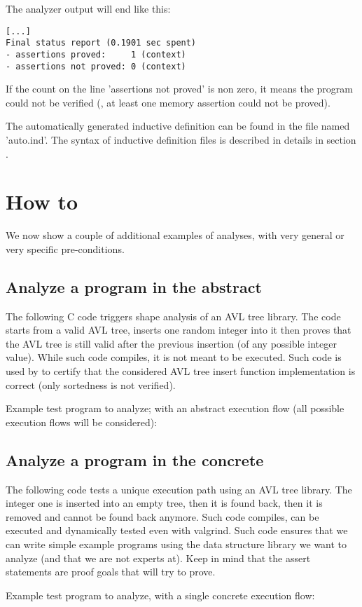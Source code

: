 The analyzer output will end like this:
\begin{verbatim}
[...]
Final status report (0.1901 sec spent)
- assertions proved:     1 (context)
- assertions not proved: 0 (context)
\end{verbatim}
If the count on the line 'assertions not proved' is non zero, it means
the program could not be verified (\ie, at least one memory assertion
could not be proved).

The automatically generated inductive definition can be found in the file
named 'auto.ind'.
The syntax of inductive definition files is described in details
in section .

\section{How to}
We now show a couple of additional examples of analyses, with very general
or very specific pre-conditions.

\subsection{Analyze a program in the abstract}
The following C code triggers shape analysis of an AVL tree library.
The code starts from a valid AVL tree, inserts one random integer
into it then proves that the AVL tree is still valid after
the previous insertion (of any possible integer value).
While such code compiles, it is not meant to be executed.
Such code is used by \memcad to certify that
the considered AVL tree insert function implementation is correct
(only sortedness is not verified).

Example test program to analyze; with an abstract
execution flow (all possible execution flows will be considered):


\subsection{Analyze a program in the concrete}
The following code tests a unique execution path using an AVL tree library.
The integer one is inserted into an empty tree, then it is found back,
then it is removed and cannot be found back anymore.
Such code compiles, can be executed and dynamically tested even
with valgrind.
Such code ensures that we can write simple example programs using the
data structure library we want to analyze (and that we are not experts at).
Keep in mind that the assert statements are proof goals that \memcad
will try to prove.

Example test program to analyze, with a single concrete
execution flow:

